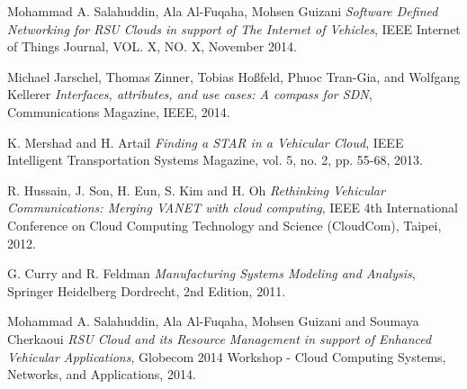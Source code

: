 \documentclass[conference]{IEEEtran}
\begin{document}
\begin{thebibliography}{1}

Mohammad A. Salahuddin, Ala Al-Fuqaha, Mohsen Guizani \emph{Software Defined Networking for RSU Clouds in support of The Internet of Vehicles}, IEEE Internet of Things Journal, VOL. X, NO. X, November 2014.


Michael Jarschel, Thomas Zinner, Tobias Hoßfeld, Phuoc Tran-Gia, and Wolfgang Kellerer \emph{Interfaces, attributes, and use cases: A compass for SDN}, Communications Magazine, IEEE, 2014.


K. Mershad and H. Artail \emph{Finding a STAR in a Vehicular Cloud}, IEEE
Intelligent Transportation Systems Magazine, vol. 5, no. 2, pp. 55-68, 2013.

R. Hussain, J. Son, H. Eun, S. Kim and H. Oh \emph{Rethinking Vehicular
Communications: Merging VANET with cloud computing}, IEEE 4th
International Conference on Cloud Computing Technology and Science
(CloudCom), Taipei, 2012.

G. Curry and R. Feldman \emph{Manufacturing Systems Modeling and Analysis}, Springer Heidelberg Dordrecht, 2nd Edition, 2011.

Mohammad A. Salahuddin, Ala Al-Fuqaha, Mohsen Guizani and Soumaya Cherkaoui \emph{RSU Cloud and its Resource Management in
support of Enhanced Vehicular Applications}, Globecom 2014 Workshop - Cloud Computing Systems, Networks, and Applications, 2014.








\end{thebibliography}
\end{document}
